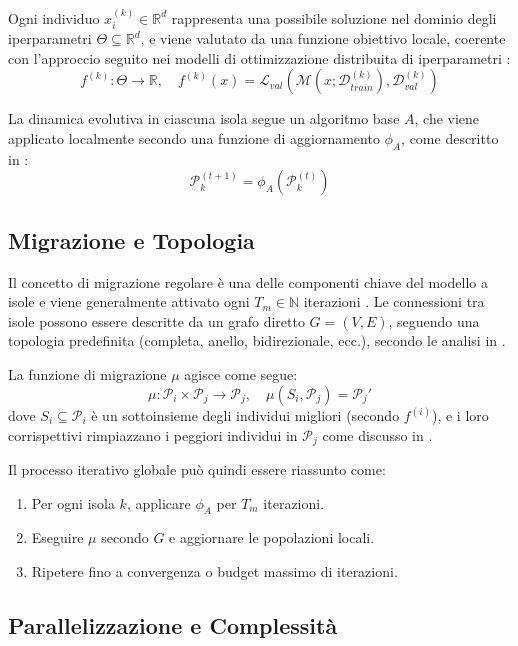 \documentclass{article}
\begin{document}
Ogni individuo $x_i^{(k)} \in \mathbb{R}^d$ rappresenta una possibile soluzione nel dominio degli 
iperparametri $\Theta \subseteq \mathbb{R}^d$, e viene valutato da una funzione obiettivo locale, 
coerente con l'approccio seguito nei modelli di ottimizzazione distribuita di iperparametri \cite{li2019openbox}:
\[
f^{(k)} : \Theta \to \mathbb{R}, \quad f^{(k)}(x) = \mathcal{L}_{val}(\mathcal{M}(x; \mathcal{D}_{train}^{(k)}), \mathcal{D}_{val}^{(k)})
\]

La dinamica evolutiva in ciascuna isola segue un algoritmo base $A$, che viene applicato localmente 
secondo una funzione di aggiornamento $\phi_A$, come descritto in \cite{kennedy1995particle, engelbrecht2007computational}:
\[
\mathcal{P}_k^{(t+1)} = \phi_A(\mathcal{P}_k^{(t)})
\]

\subsection{Migrazione e Topologia}

Il concetto di migrazione regolare è una delle componenti chiave del modello a isole e viene 
generalmente attivato ogni $T_m \in \mathbb{N}$ iterazioni \cite{tomassini2005spatially}. 
Le connessioni tra isole possono essere descritte da un grafo diretto $G = (V, E)$, seguendo una 
topologia predefinita (completa, anello, bidirezionale, ecc.), secondo le analisi in \cite{cantupaz1998survey}.

La funzione di migrazione $\mu$ agisce come segue:
\[
\mu: \mathcal{P}_i \times \mathcal{P}_j \rightarrow \mathcal{P}_j, \quad \mu(S_i, \mathcal{P}_j) = \mathcal{P}_j'
\]
dove $S_i \subseteq \mathcal{P}_i$ è un sottoinsieme degli individui migliori (secondo $f^{(i)}$), e i loro corrispettivi rimpiazzano i peggiori individui in $\mathcal{P}_j$ come discusso in \cite{alba2002parallelism}.

Il processo iterativo globale può quindi essere riassunto come:

\begin{enumerate}
    \item Per ogni isola $k$, applicare $\phi_A$ per $T_m$ iterazioni.
    \item Eseguire $\mu$ secondo $G$ e aggiornare le popolazioni locali.
    \item Ripetere fino a convergenza o budget massimo di iterazioni.
\end{enumerate}

\subsection{Parallelizzazione e Complessità}
\end{document}
